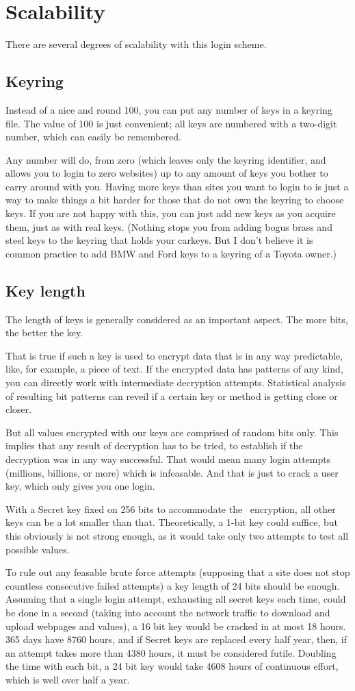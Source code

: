 \section{Scalability}
There are several degrees of scalability with this login scheme.
\subsection{Keyring}
Instead of a nice and round 100,
you can put any number of keys in a keyring file.
The value of 100 is just convenient;
all keys are numbered with a two-digit number,
which can easily be remembered.
\par
Any number will do,
from zero
(which leaves only the keyring identifier,
and allows you to login to zero websites)
up to any amount of keys you bother to carry around with you.
Having more keys than sites you want to login to is just a way to make things a bit harder for those that do not own the keyring to choose keys.
If you are not happy with this,
you can just add new keys as you acquire them,
just as with real keys.
(Nothing stops you from adding bogus brass and steel keys to the keyring that holds your carkeys.
But I don't believe it is common practice to add BMW and Ford keys to a keyring of a Toyota owner.)
\subsection{Key length}
The length of keys is generally considered as an important aspect.
The more bits, the better the key.
\par
That is true if such a key is used to encrypt data that is in any way predictable,
like, for example, a piece of text.
If the encrypted data has patterns of any kind,
you can directly work with intermediate decryption attempts.
Statistical analysis of resulting bit patterns can reveil if a certain key or method is getting close or closer.
\par
But all values encrypted with our keys are comprised of random bits only.
This implies that any result of decryption has to be tried,
to establish if the decryption was in any way successful.
That would mean many login attempts
(millions, billions, or more)
which is infeasable.
And that is just to crack a user key,
which only gives you one login.
\par
With a Secret key fixed on 256 bits to accommodate the \AES\ encryption,
all other keys can be a lot smaller than that.
Theoretically,
a 1-bit key could suffice,
but this obviously is not strong enough,
as it would take only two attempts to test all possible values.
\par
To rule out any feasable brute force attempts
(supposing that a site does not stop countless consecutive failed attempts)
a key length of 24 bits should be enough.
Assuming that a single login attempt,
exhausting all secret keys each time,
could be done in a second
(taking into account the network traffic to download and upload webpages and values),
a 16 bit key would be cracked in at most 18 hours.
365 days have 8760 hours,
and if Secret keys are replaced every half year,
then,
if an attempt takes more than 4380 hours,
it must be considered futile.
Doubling the time with each bit,
a 24 bit key would take 4608 hours of continuous effort,
which is well over half a year.

